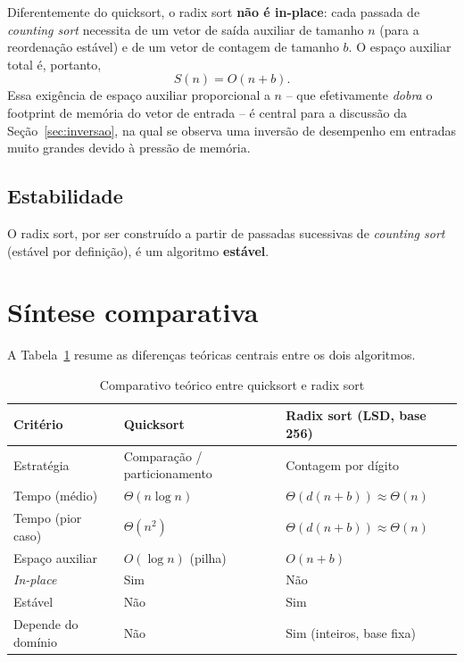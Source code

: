 \documentclass[
	12pt,
	oneside,
	a4paper,
	chapter=TITLE,
	section=TITLE,
	subsection=TITLE,
	subsubsection=TITLE,
	english,
	brazil
]{abntex2}
\theoremstyle{plain}
\theoremstyle{remark}
\renewcommand{\_}{\underscoreoriginal\allowbreak}
\begin{document}
Diferentemente do quicksort, o radix sort \textbf{não é in-place}: cada passada de \emph{counting sort} necessita de um vetor de saída auxiliar de tamanho $n$ (para a reordenação estável) e de um vetor de contagem de tamanho $b$. O espaço auxiliar total é, portanto,
\[
S(n) = O(n + b).
\]
Essa exigência de espaço auxiliar proporcional a $n$ -- que efetivamente \emph{dobra} o footprint de memória do vetor de entrada -- é central para a discussão da Seção~\ref{sec:inversao}, na qual se observa uma inversão de desempenho em entradas muito grandes devido à pressão de memória.

\subsection{Estabilidade}

O radix sort, por ser construído a partir de passadas sucessivas de \emph{counting sort} (estável por definição), é um algoritmo \textbf{estável}.

\section{Síntese comparativa}

A Tabela~\ref{tab:comparativo-teorico} resume as diferenças teóricas centrais entre os dois algoritmos.

\begin{table}[H]
	\caption{Comparativo teórico entre quicksort e radix sort}
	\label{tab:comparativo-teorico}
	\centering
	\begin{tabular}{l l l}
		\toprule
		\textbf{Critério} & \textbf{Quicksort} & \textbf{Radix sort (LSD, base 256)} \\
		\midrule
		Estratégia & Comparação / particionamento & Contagem por dígito \\
		Tempo (médio) & $\Theta(n \log n)$ & $\Theta(d(n+b)) \approx \Theta(n)$ \\
		Tempo (pior caso) & $\Theta(n^2)$ & $\Theta(d(n+b)) \approx \Theta(n)$ \\
		Espaço auxiliar & $O(\log n)$ (pilha) & $O(n+b)$ \\
		\emph{In-place} & Sim & Não \\
		Estável & Não & Sim \\
		Depende do domínio & Não & Sim (inteiros, base fixa) \\
		\bottomrule
	\end{tabular}
\end{table}
\end{document}

